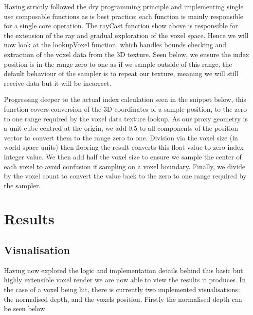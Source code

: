 \documentclass[titlepage]{article}
\begin{document}


Having strictly followed the \gls{dry} programming principle and implementing single use composable functions as is best practice; each function is mainly responsible for a single core operation. The rayCast function show above is responsible for the extension of the ray and gradual exploration of the voxel space. Hence we will now look at the lookupVoxel function, which handles bounds checking and extraction of the voxel data from the 3D texture. Seen below, we ensure the index position is in the range zero to one as if we sample outside of this range, the default behaviour of the sampler is to repeat our texture, meaning we will still receive data but it will be incorrect.



Progressing deeper to the actual index calculation seen in the snippet below, this function covers conversion of the 3D coordinates of a sample position, to the zero to one range required by the voxel data texture lookup. As our proxy geometry is a unit cube centred at the origin, we add 0.5 to all components of the position vector to convert them to the range zero to one. Division via the voxel size (in world space units) then flooring the result converts this float value to zero index integer value. We then add half the voxel size to ensure we sample the center of each voxel to avoid confusion if sampling on a voxel boundary. Finally, we divide by the voxel count to convert the value back to the zero to one range required by the sampler.



\section{Results}

\subsection{Visualisation}

Having now explored the logic and implementation details behind this basic but highly extensible voxel render we are now able to view the results it produces. In the case of a voxel being hit, there is currently two implemented visualisations; the normalised depth, and the voxels position. Firstly the normalised depth can be seen below.
\end{document}
